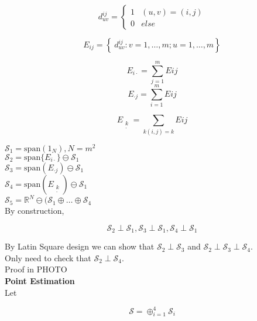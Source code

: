 \documentclass[11pt,fleqn]{book} %
\begin{document}
\begin{notation}
			$$d^{ij}_{uv} = \left\{ \begin{array}{ll}
										1 &  (u,v) = (i, j)\\
										0 & else
									\end{array} \right.$$

			$$E_{ij} = \left\{\ d^{ij}_{uv}: v = 1, \dots, m; u = 1, \dots, m \right\} $$


								
\end{notation}

		$$E_{i\cdot} = \sum^m_{j=1} E{ij} $$
		$$E_{\cdot j} = \sum^m_{i=1} E{ij} $$

		$$E_{\begin{matrix}
				k\\
				\cdot
			\end{matrix}} = \sum_{k(i,j) = k} E{ij} $$


$\mathcal{S}_1 = \text{span}(1_N), N = m^2 $\\
$\mathcal{S}_2 = \text{span}\{E_{i \cdot}\} \ominus \mathcal{S}_1$\\
$\mathcal{S}_3 = \text{span}(E_{\cdot j})\ominus \mathcal{S}_1 $\\
$\mathcal{S}_4 = \text{span}(E_{\begin{matrix}
				k\\
				\cdot
			\end{matrix}})\ominus \mathcal{S}_1 $\\
$\mathcal{S}_5 = \mathbb{R}^N \ominus (\mathcal{S}_1 \oplus \dots \oplus \mathcal{S}_4$\\


By construction, 
		
		$$\mathcal{S}_2 \perp \mathcal{S}_1,  \mathcal{S}_3 \perp \mathcal{S}_1, \mathcal{S}_4 \perp \mathcal{S}_1$$

By Latin Square design we can show that $\mathcal{S}_2 \perp \mathcal{S}_3$ and $\mathcal{S}_2 \perp \mathcal{S}_3 \perp \mathcal{S}_4$. \\


Only need to check that $\mathcal{S}_2 \perp \mathcal{S}_4$. \\


Proof in PHOTO\\


\textbf{Point Estimation}\\

Let 

	$$\mathcal{S} = \oplus_{i=1}^4 \mathcal{S}_i$$
\end{document}
